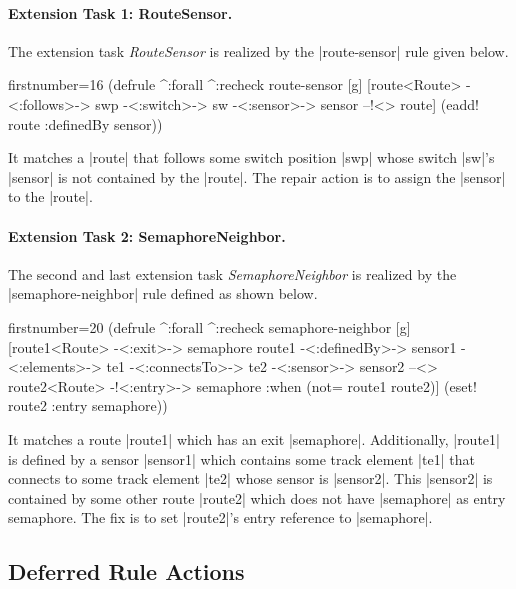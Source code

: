 \documentclass[submission]{eptcs}
\newcommand{\code}{\clojureinline}
\begin{document}
\paragraph{Extension Task 1: RouteSensor.}

The extension task \emph{RouteSensor} is realized by the \code|route-sensor|
rule given below.

\begin{clojurecode*}{firstnumber=16}
(defrule ^:forall ^:recheck route-sensor [g]
  [route<Route> -<:follows>-> swp -<:switch>-> sw
   -<:sensor>-> sensor --!<> route]
  (eadd! route :definedBy sensor))
\end{clojurecode*}

It matches a \code|route| that follows some switch position \code|swp| whose
switch \code|sw|'s \code|sensor| is not contained by the \code|route|.  The
repair action is to assign the \code|sensor| to the \code|route|.


\paragraph{Extension Task 2: SemaphoreNeighbor.}

The second and last extension task \emph{SemaphoreNeighbor} is realized by the
\code|semaphore-neighbor| rule defined as shown below.

\begin{clojurecode*}{firstnumber=20}
(defrule ^:forall ^:recheck semaphore-neighbor [g]
  [route1<Route> -<:exit>-> semaphore
   route1 -<:definedBy>-> sensor1 -<:elements>-> te1
   -<:connectsTo>-> te2 -<:sensor>-> sensor2
   --<> route2<Route> -!<:entry>-> semaphore
   :when (not= route1 route2)]
  (eset! route2 :entry semaphore))
\end{clojurecode*}

It matches a route \code|route1| which has an exit \code|semaphore|.
Additionally, \code|route1| is defined by a sensor \code|sensor1| which
contains some track element \code|te1| that connects to some track element
\code|te2| whose sensor is \code|sensor2|.  This \code|sensor2| is contained by
some other route \code|route2| which does not have \code|semaphore| as entry
semaphore.  The fix is to set \code|route2|'s entry reference to
\code|semaphore|.


\subsection{Deferred Rule Actions}
\label{sec:deferred-actions}
\end{document}

